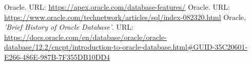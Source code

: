 \documentclass[10pt]{article}
\begin{document}
\begin{thebibliography}{}
	\bibitem{}Oracle. URL: \url{https://apex.oracle.com/database-features/}
	\bibitem{}Oracle. URL: \url{https://www.oracle.com/technetwork/articles/sql/index-082320.html}
	\bibitem{}Oracle, \textit{'Brief History of Oracle Database'}. URL: \url{https://docs.oracle.com/en/database/oracle/oracle-database/12.2/cncpt/introduction-to-oracle-database.html#GUID-35C20601-E266-486E-987B-7F355DB10DD4}
\end{thebibliography}

 
\end{document}
